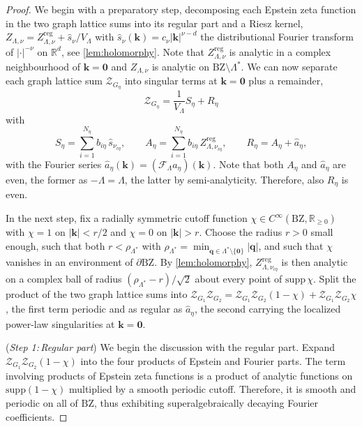 \documentclass[10pt,a4paper]{amsart}
\begin{document}
\begin{proof}
We begin with a preparatory step, decomposing each Epstein zeta function in the two graph lattice sums into its regular part and a Riesz kernel,
$Z_{\Lambda,\nu}=Z^{\mathrm{reg}}_{\Lambda,\nu}+\hat s_\nu/V_\Lambda$ with
$\hat s_\nu(\bm k)=c_\nu|\bm k|^{\nu-d}$ the distributional Fourier transform of $\vert\bm \cdot\vert^{-\nu}$ on $\mathds R^d$, see \cref{lem:holomorphy}. Note that $Z^{\mathrm{reg}}_{\Lambda,\nu}$ is analytic in a complex
neighbourhood of $\bm k=\bm 0$ and $Z_{\Lambda,\nu}$ is analytic on
$\mathrm{BZ}\setminus\Lambda^\ast$. We can now separate each graph lattice sum $\mathcal Z_{G_\eta}$ into singular terms at $\bm k=\bm 0$ plus a remainder, 
\[
\mathcal Z_{G_\eta}=\frac{1}{V_\Lambda}S_\eta+R_\eta
\]
with
\[
S_\eta=\sum_{i=1}^{N_\eta} b_{i\eta}\,\hat s_{\nu_{i\eta}},
\qquad
A_\eta=\sum_{i=1}^{N_\eta} b_{i\eta}\,Z^{\mathrm{reg}}_{\Lambda,\nu_{i\eta}},
\qquad
R_\eta=A_\eta+\hat a_\eta,
\]
with the Fourier series $\hat a_\eta(\bm k)= (\mathcal F_\Lambda a_\eta)(\bm k)$.
Note that both $A_\eta$ and $\hat a_\eta$ are even, the former as $-\Lambda=\Lambda$, the latter by semi-analyticity. Therefore, also $R_\eta$ is even.

In the next step, fix a radially symmetric cutoff function $\chi\in C^\infty(\mathrm{BZ},\mathds R_{\ge0})$ with $\chi=1$ on $|\bm k|<r/2$ and $\chi=0$ on $|\bm k|>r$. Choose the radius $r>0$ small enough, such that both $r<\rho_{\Lambda^\ast}$ with $\rho_{\Lambda^\ast}=\min_{\bm q\in\Lambda^\ast\setminus\{\bm 0\}}|\bm q|$, and such that $\chi$ vanishes in an environment of $\partial\mathrm{BZ}$.  By \cref{lem:holomorphy}, $Z^{\mathrm{reg}}_{\Lambda,\nu_{i\eta}}$ is then analytic on a complex ball of radius
$(\rho_{\Lambda^\ast}-r)/\sqrt2$ about every point of $\mathrm{supp}\,\chi$. Split the product of the two graph lattice sums into $\mathcal Z_{G_1} \mathcal Z_{G_2}=\mathcal Z_{G_1} \mathcal Z_{G_2}(1-\chi)+\mathcal Z_{G_1} \mathcal Z_{G_2}\chi$, the first term periodic and as regular as $\hat a_\eta$, the second carrying the localized power-law singularities at $\bm k=\bm 0$.

(\emph{Step 1:\,Regular part}) We begin the discussion with the regular part. Expand $\mathcal Z_{G_1}\mathcal Z_{G_2}(1-\chi)$ into the four products of Epstein and Fourier parts. The term involving products of Epstein zeta functions is a product of analytic functions on $\mathrm{supp}(1-\chi)$ multiplied by a smooth periodic cutoff. 
Therefore, it is smooth and periodic on all of $\mathrm{BZ}$, thus exhibiting superalgebraically decaying Fourier coefficients. 


\end{proof}
\end{document}
